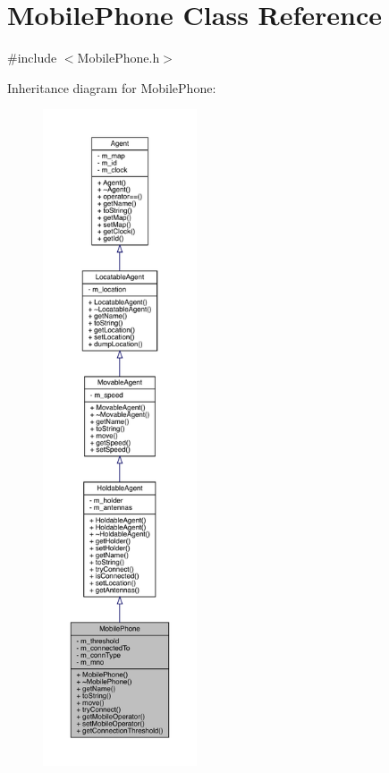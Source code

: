 \hypertarget{class_mobile_phone}{}\section{Mobile\+Phone Class Reference}
\label{class_mobile_phone}


{\ttfamily \#include $<$Mobile\+Phone.\+h$>$}



Inheritance diagram for Mobile\+Phone\+:
\nopagebreak
\begin{figure}[H]
\begin{center}
\leavevmode
\includegraphics[height=550pt]{class_mobile_phone__inherit__graph}
\end{center}
\end{figure}


